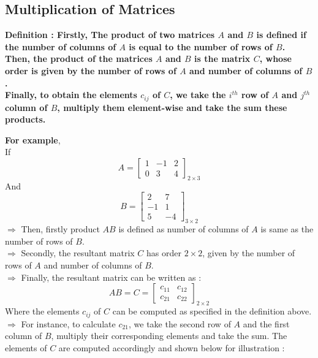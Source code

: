 \documentclass[12pt, letterpaper]{article}
\begin{document}
\subsection{Multiplication of Matrices}
\begin{displayquote}
\textbf{Definition : Firstly, The product of two matrices $A$ and $B$ is defined if the number of columns of $A$ is equal to the number of rows of $B$.\\ 
Then, the product of the matrices $A$ and $B$ is the matrix $C$, whose order is given by the number of rows of $A$ and number of columns of $B$.\\
Finally, to obtain the elements $c_{ij}$ of $C$, we take the $i^{th}$ row of $A$ and $j^{th}$ column of $B$, multiply them element-wise and take the sum these products.}  
\end{displayquote}
\textbf{For example},\\
If
\begin{displaymath}
 A = \begin{bmatrix}
1 & -1 & 2\\
0 & 3 & 4
\end{bmatrix}_{2 \times 3}
\end{displaymath} 
And 
\begin{displaymath}
B = \begin{bmatrix}
2 & 7\\
-1 & 1\\
5 & -4
\end{bmatrix}_{3 \times 2}
\end{displaymath}
$\Rightarrow$ Then, firstly product $AB$ is defined as number of columns of $A$ is same as the number of rows of $B$.\\
$\Rightarrow$ Secondly, the resultant matrix $C$ has order $2 \times 2$, given by the number of rows of $A$ and number of columns of $B$.\\
$\Rightarrow$ Finally, the resultant matrix can be written as : 
\begin{displaymath}
AB = C = \begin{bmatrix}
c_{11} & c_{12}\\
c_{21} & c_{22}
\end{bmatrix}_{2 \times 2}
\end{displaymath}
Where the elements $c_{ij}$ of $C$ can be computed as specified in the definition above.\\
$\Rightarrow$ For instance, to calculate $c_{21}$, we take the second row of $A$ and the first column of $B$, multiply their corresponding elements and take the sum. The elements of $C$ are computed accordingly and shown below for illustration :  
\end{document}
